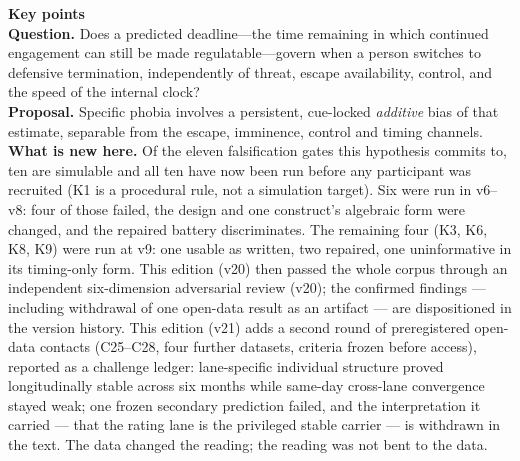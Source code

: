 \documentclass[9pt,twocolumn]{article}
\begin{document}
\vspace{0.35em}
\begin{center}
\parbox{0.95\columnwidth}{\footnotesize\sffamily\color{RRHMNavy}
\textbf{\color{RRHMSlate}Key points}\\[0.25em]
\textbf{Question.} Does a predicted deadline---the time remaining in which
continued engagement can still be made regulatable---govern when a person
switches to defensive termination, independently of threat, escape
availability, control, and the speed of the internal clock?\\[0.2em]
\textbf{Proposal.} Specific phobia involves a persistent, cue-locked
\emph{additive} bias of that estimate, separable from the escape, imminence,
control and timing channels.\\[0.2em]
\textbf{What is new here.} Of the eleven falsification gates this hypothesis
commits to, ten are simulable and all ten have now been run before any
participant was recruited (K1 is a procedural rule, not a simulation target).
Six were run in v6--v8: four of those failed, the design and one construct's
algebraic form were changed, and the repaired battery discriminates. The
remaining four (K3, K6, K8, K9) were run at v9: one usable as written, two
repaired, one uninformative in its timing-only form. This edition (v20) then
passed the whole corpus through an independent six-dimension adversarial
review (v20); the confirmed findings --- including withdrawal of one open-data
result as an artifact --- are dispositioned in the version history. This
edition (v21) adds a second round of preregistered open-data contacts
(C25--C28, four further datasets, criteria frozen before access), reported as
a challenge ledger: lane-specific individual structure proved longitudinally
stable across six months while same-day cross-lane convergence stayed weak;
one frozen secondary prediction failed, and the interpretation it carried ---
that the rating lane is the privileged stable carrier --- is withdrawn in the
text. The data changed the reading; the reading was not bent to the data.}
\end{center}
\end{document}

